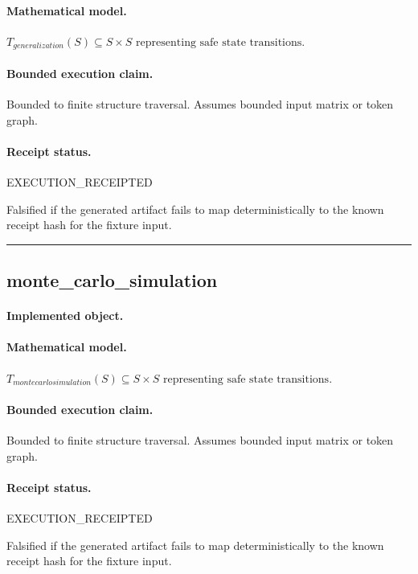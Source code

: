 \paragraph{Mathematical model.} $T_{generalization}(S) \subseteq S \times S \text{ representing safe state transitions}.$
\paragraph{Bounded execution claim.} Bounded to finite structure traversal. Assumes bounded input matrix or token graph.
\paragraph{Receipt status.} EXECUTION\_RECEIPTED
\begin{falsifier}
Falsified if the generated artifact fails to map deterministically to the known receipt hash for the fixture input.
\end{falsifier}

\vspace{1em}\hrule\vspace{1em}
\subsection{monte\_carlo\_simulation}
\paragraph{Implemented object.} 
\paragraph{Mathematical model.} $T_{montecarlosimulation}(S) \subseteq S \times S \text{ representing safe state transitions}.$
\paragraph{Bounded execution claim.} Bounded to finite structure traversal. Assumes bounded input matrix or token graph.
\paragraph{Receipt status.} EXECUTION\_RECEIPTED
\begin{falsifier}
Falsified if the generated artifact fails to map deterministically to the known receipt hash for the fixture input.
\end{falsifier}

